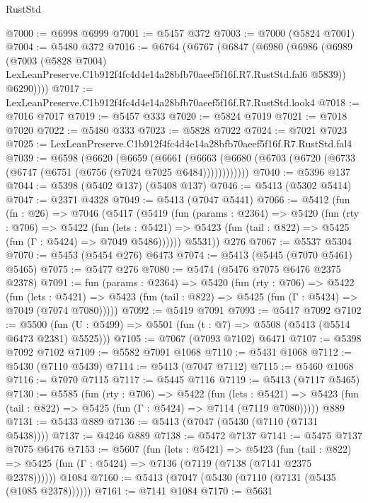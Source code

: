 \begin{lexlean}{RustStd}
\begin{coremodule}
@7000 := @6998 @6999
@7001 := @5457 @372
@7003 := @7000 (@5824 @7001)
@7004 := @5480 @372
@7016 := @6764
    (@6767
      (@6847
        (@6980
          (@6986
            (@6989
              (@7003
                (@5828 @7004)
                LexLeanPreserve.C1b912f4fc4d4e14a28bfb70aeef5f16f.R7.RustStd.fal6
                @5839))
            @6290))))
@7017 := LexLeanPreserve.C1b912f4fc4d4e14a28bfb70aeef5f16f.R7.RustStd.look4
@7018 := @7016 @7017
@7019 := @5457 @333
@7020 := @5824 @7019
@7021 := @7018 @7020
@7022 := @5480 @333
@7023 := @5828 @7022
@7024 := @7021 @7023
@7025 := LexLeanPreserve.C1b912f4fc4d4e14a28bfb70aeef5f16f.R7.RustStd.fal4
@7039 := @6598
    (@6620
      (@6659
        (@6661
          (@6663 (@6680 (@6703 (@6720 (@6733 (@6747 (@6751 (@6756 (@7024 @7025 @6484))))))))))))
@7040 := @5396 @137
@7044 := @5398 (@5402 @137) (@5408 @137)
@7046 := @5413 (@5302 @5414)
@7047 := @2371 @4328
@7049 := @5413 (@7047 @5441)
@7066 := @5412
    (fun (fn : @26) =>
    @7046
      (@5417
        (@5419
          (fun (params : @2364) =>
          @5420
            (fun (rty : @706) =>
            @5422
              (fun (lets : @5421) =>
              @5423 (fun (tail : @822) => @5425 (fun (Γ : @5424) => @7049 @5486))))))
        @5531))
    @276
@7067 := @5537 @5304
@7070 := @5453 (@5454 @276) @6473
@7074 := @5413 (@5445 (@7070 @5461) @5465)
@7075 := @5477 @276
@7080 := @5474 (@5476 @7075 @6476 @2375 @2378)
@7091 := fun (params : @2364) =>
  @5420
    (fun (rty : @706) =>
    @5422
      (fun (lets : @5421) =>
      @5423 (fun (tail : @822) => @5425 (fun (Γ : @5424) => @7049 (@7074 @7080)))))
@7092 := @5419 @7091
@7093 := @5417 @7092
@7102 := @5500 (fun (U : @5499) => @5501 (fun (t : @7) => @5508 (@5413 (@5514 @6473 @2381) @5525)))
@7105 := @7067 (@7093 @7102) @6471
@7107 := @5398 @7092 @7102
@7109 := @5582 @7091 @1068
@7110 := @5431 @1068
@7112 := @5430 (@7110 @5439)
@7114 := @5413 (@7047 @7112)
@7115 := @5460 @1068
@7116 := @7070 @7115
@7117 := @5445 @7116
@7119 := @5413 (@7117 @5465)
@7130 := @5585
    (fun (rty : @706) =>
    @5422
      (fun (lets : @5421) =>
      @5423 (fun (tail : @822) => @5425 (fun (Γ : @5424) => @7114 (@7119 @7080)))))
    @889
@7131 := @5433 @889
@7136 := @5413 (@7047 (@5430 (@7110 (@7131 @5438))))
@7137 := @4246 @889
@7138 := @5472 @7137
@7141 := @5475 @7137 @7075 @6476
@7153 := @5607
    (fun (lets : @5421) =>
    @5423
      (fun (tail : @822) => @5425 (fun (Γ : @5424) => @7136 (@7119 (@7138 (@7141 @2375 @2378))))))
    @1084
@7160 := @5413 (@7047 (@5430 (@7110 (@7131 (@5435 (@1085 @2378))))))
@7161 := @7141 @1084
@7170 := @5631

\end{coremodule}
\end{lexlean}
